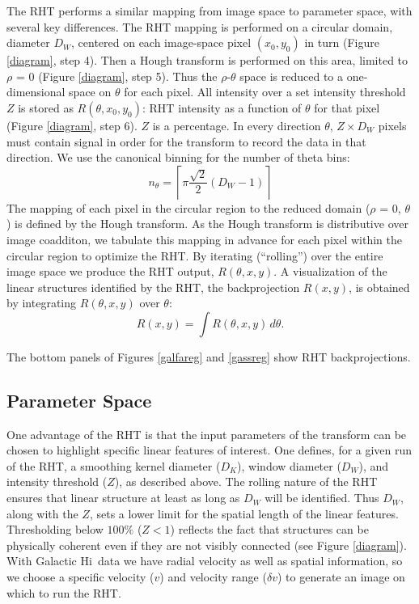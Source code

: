 \documentclass[12pt]{emulateapj}
\newcommand{\beq}{\begin{equation}}
\newcommand{\eeq}{\end{equation}}
\newcommand{\hi}{H{\sc i}~}
\begin{document}
The RHT performs a similar mapping from image space to parameter space, with several key differences. The RHT mapping is performed on a circular domain, diameter $D_W$, centered on each image-space pixel $\left(x_0, y_0\right)$ in turn (Figure \ref{diagram}, step 4). Then a Hough transform is performed on this area, limited to  ${\rho}$ = 0 (Figure \ref{diagram}, step 5). Thus the $\rho$-$\theta$ space is reduced to a one-dimensional space on $\theta$ for each pixel. All intensity over a set intensity threshold $Z$ is stored as $R(\theta, x_0, y_0)$: RHT intensity as a function of $\theta$ for that pixel (Figure \ref{diagram}, step 6). $Z$ is a percentage. In every direction ${\theta}$, $Z \times D_W$ pixels must contain signal in order for the transform to record the data in that direction.
We use the canonical binning for the number of theta bins:
\beq
n_{\theta} = \left\lceil\pi \frac{\sqrt{2}}{2} \left(D_W - 1\right) \right\rceil
\eeq
The mapping of each pixel in the circular region to the reduced domain (${\rho}$ = 0, ${\theta}$) is defined by the Hough transform. 
As the Hough transform is distributive over image coadditon, we tabulate this mapping in advance for each pixel within the circular region to optimize the RHT. By iterating (``rolling'') over the entire image space we produce the RHT output, $R\left(\theta, x, y\right)$.
A visualization of the linear structures identified by the RHT, the backprojection $R\left(x, y\right)$, is obtained by integrating ${R(\theta, x, y)}$ over ${\theta}$:
\beq\label{Bxy}
R(x, y) = \int R(\theta, x, y)\,d\theta.
\eeq

The bottom panels of Figures \ref{galfareg} and \ref{gassreg} show RHT backprojections.

\subsection{Parameter Space}\label{pspace}

One advantage of the RHT is that the input parameters of the transform can be chosen to highlight specific linear features of interest. One defines, for a given run of the RHT, a smoothing kernel diameter ($D_K$), window diameter ($D_W$), and intensity threshold ($Z$), as described above. The rolling nature of the RHT ensures that linear structure at least as long as $D_W$ will be identified. Thus $D_W$, along with the $Z$, sets a lower limit for the spatial length of the linear features. Thresholding below ${100\%}$ ($Z < 1$) reflects the fact that structures can be physically coherent even if they are not visibly connected (see Figure \ref{diagram}). With Galactic \hi data we have radial velocity as well as spatial information, so we choose a specific velocity ($v$) and velocity range ($\delta v$) to generate an image on which to run the RHT.
\end{document}

